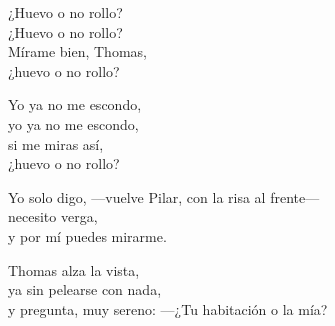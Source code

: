 \begin{lyrics}
¿Huevo o no rollo?\\
¿Huevo o no rollo?\\
Mírame bien, Thomas,\\
¿huevo o no rollo?

Yo ya no me escondo,\\
yo ya no me escondo,\\
si me miras así,\\
¿huevo o no rollo?

Yo solo digo,
—vuelve Pilar, con la risa al frente—\\
necesito verga,\\
y por mí puedes mirarme.

Thomas alza la vista,\\
ya sin pelearse con nada,\\
y pregunta, muy sereno:
—¿Tu habitación o la mía?
\end{lyrics}

